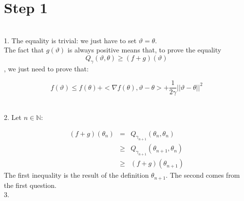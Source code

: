 	\section*{Step 1}
	~\\
	
	1. The equality is trivial: we just have to set $\vartheta=\theta$.\\
	
	The fact that $g(\vartheta)$ is always positive means that, to prove the equality $$ Q_{\gamma}(\vartheta,\theta)\geq (f+g)(\vartheta)$$, we just need to prove that:
	
	$$f(\vartheta)\leq f(\theta)+<\nabla f(\theta),\vartheta-\theta>+\frac{1}{2\gamma}\vert\vert \vartheta-\theta\vert\vert^2$$
	
	~\\
	
	2. Let $n \in \mathbb{N}$:
	
	\begin{eqnarray*}
		(f+g)(\theta_{n})&=& Q_{\gamma_{n+1}}(\theta_{n},\theta_{n})\\
								&\geq& Q_{\gamma_{n+1}}(\theta_{n+1},\theta_{n})\\ 
								&\geq& (f+g)(\theta_{n+1})
	\end{eqnarray*}
	The first inequality is the result of the definition $\theta_{n+1}$. The second comes from the first question.\\
	
	3. 
	
	
